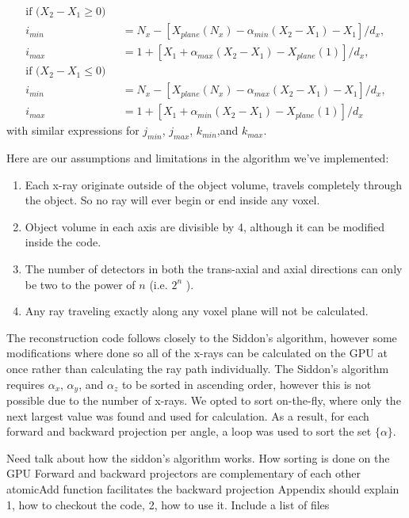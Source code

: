 \begin{equation}
	\begin{aligned}
	\text{if ($X_2 - X_1 \geq 0 )$ }\\
	i_{min} &= N_x - \left[ X_{plane}(N_x) - \alpha_{min} (X_2 - X_1) - X_1 \right] /  d_x, \\
	i_{max} &= 1 + \left[ X_1 + \alpha_{max} (X_2 - X_1) - X_{plane}(1) \right] / d_x, \\
	\text{if ($X_2 - X_1 \leq 0 )$ }\\
	i_{min} &= N_x - \left[ X_{plane}(N_x) - \alpha_{max} (X_2 - X_1) - X_1 \right] /  d_x, \\
	i_{max} &= 1 + \left[ X_1 + \alpha_{min} (X_2 - X_1) - X_{plane}(1) \right] / d_x
	\end{aligned}
\label{eq:siddon_ijkminmax}
\end{equation}
with similar expressions for $j_{min}$, $j_{max}$, $k_{min}$,and $k_{max}$.


Here are our assumptions and limitations in the algorithm we've implemented:
\begin{enumerate}
\item Each x-ray originate outside of the object volume, travels completely through the object.  So no ray will ever begin or end inside any voxel.
\item Object volume in each axis are divisible by 4, although it can be modified inside the code.
\item The number of detectors in both the trans-axial and axial directions can only be two to the power of $n$ (i.e. $2^n$ ).
\item Any ray traveling exactly along any voxel plane will not be calculated.
\end{enumerate}

The reconstruction code follows closely to the Siddon's algorithm, however some modifications where done so all of the x-rays can be calculated on the GPU at once rather than calculating the ray path individually. The Siddon's algorithm requires $\alpha_x$, $\alpha_y$, and $\alpha_z$ to be sorted in ascending order, however this is not possible due to the number of x-rays.  We opted to sort on-the-fly, where only the next largest value was found and used for calculation.  As a result, for each forward and backward projection per angle, a loop was used to sort the set $\{ \alpha \}$.





Need talk about how the siddon's algorithm works.
How sorting is done on the GPU
Forward and backward projectors are complementary of each other
atomicAdd function facilitates the backward projection
Appendix should explain 1, how to checkout the code, 2, how to use it. Include a list of files


